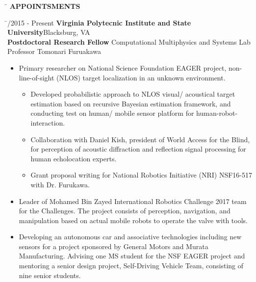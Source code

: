 \documentclass[11pt,letter]{article}
\begin{document}
\begin{tabbing}
	\hspace{1cm}\=\kill
	\>  {\bf \Large APPOINTSMENTS}
\end{tabbing}\vspace{-7mm}
\begin{tabbing}
	\hspace{3cm} \= /2015 - Present \> {\bf Virginia Polytecnic Institute and State University}\hfill{Blacksburg, VA }\\
	\> {\bfseries Postdoctoral Research Fellow}	Computational Multiphysics and Systems Lab\\
	\> Professor Tomonari Furuakawa\\
\end{tabbing}
\vspace{-1cm}
			\begin{itemize}
				\item Primary researcher on National Science Foundation EAGER project, non-line-of-sight (NLOS) target localization in an unknown environment.
				\begin{itemize}
					\item Developed probabilistic approach to NLOS visual/ acoustical target estimation based on recursive Bayesian estimation framework, and conducting test on human/ mobile sensor platform for human-robot-interaction.
					\item Collaboration with Daniel Kish, president of World Access for the Blind, for perception of acoustic diffraction and reflection signal processing for human echolocation experts.
					\item Grant proposal writing for National Robotics Initiative (NRI) NSF16-517 with Dr. Furukawa.
				\end{itemize}
				\item Leader of Mohamed Bin Zayed International Robotics Challenge 2017 team for the Challenges. The project consists of perception, navigation, and manipulation based on actual mobile robots to operate the valve with tools.
				\item Developing an autonomous car and associative technologies including new sensors for a project sponsored by General Motors and Murata Manufacturing. Advising one MS student for the NSF EAGER project and mentoring a senior design project, Self-Driving Vehicle Team, consisting of nine senior students.
			\end{itemize}
\end{document}
